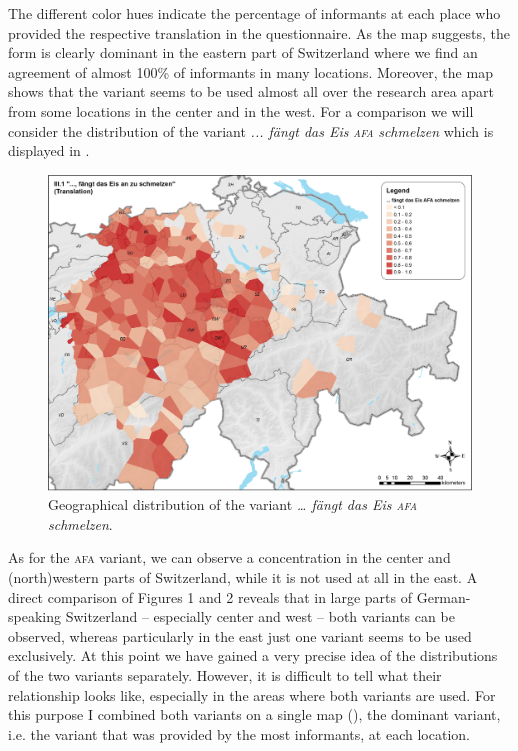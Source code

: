 \documentclass[output=paper]{LSP/langsci}
\begin{document}
The different color hues indicate the percentage of informants at each place who provided the respective translation in the questionnaire. As the map suggests, the form is clearly dominant in the eastern part of Switzerland where we find an agreement of almost 100\% of informants in many locations. Moreover, the map shows that the variant seems to be used almost all over the research area apart from some locations in the center and in the west. For a comparison we will consider the distribution of the variant \emph{... fängt das Eis }\emph{\textsc{afa}}\emph{ schmelzen} which is displayed in .

  
\begin{figure}
\includegraphics[width=\textwidth]{illustrations/stoeck_fig2}
\caption{Geographical distribution of the variant \emph{… fängt das Eis \textsc{afa} schmelzen}.}
\label{fig:stoeck:2}
\end{figure}
 
As for the \textsc{afa} variant, we can observe a concentration in the center and (north)western parts of Switzerland, while it is not used at all in the east. A direct comparison of Figures 1 and 2 reveals that in large parts of German-speaking Switzerland – especially center and west – both variants can be observed, where\-as particularly in the east just one variant seems to be used exclusively. At this point we have gained a very precise idea of the distributions of the two variants separately. However, it is difficult to tell what their relationship looks like, especially in the areas where both variants are used. For this purpose I combined both variants on a single map (), the dominant variant, i.e. the variant that was provided by the most informants, at each location.
 
\end{document}
